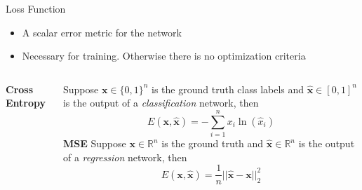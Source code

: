 \documentclass{beamer}
\begin{document}
\begin{frame}{Loss Function}
    \begin{itemize}
        \item A scalar error metric for the network
        \item Necessary for training. Otherwise there is no optimization criteria
    \end{itemize}
    \hspace{-10pt}{\bf Popular examples:}

    \vspace{20pt}
    \begin{columns}
            {\bf Cross Entropy}

            Suppose $\mathbf{x} \in \{0,1\}^n$ is the ground truth class labels
            and $\hat{\mathbf{x}} \in [0,1]^n$ is the output of a \textit{classification} network, then
            \[
                E(\mathbf{x}, \hat{\mathbf{x}}) = -\sum_{i=1}^n x_i \ln(\hat{x}_i)
            \]
            {\bf MSE}
            Suppose $\mathbf{x} \in \mathbb{R}^n$ is the ground truth  
            and $\hat{\mathbf{x}} \in \mathbb{R}^n$ is the output of a \textit{regression} network, then
            \[
                E(\mathbf{x}, \hat{\mathbf{x}}) = \frac{1}{n} ||\hat{\mathbf{x}} - \mathbf{x}||_2^2
            \]
            \vspace{10pt}

    \end{columns}    

\end{frame}
\end{document}
